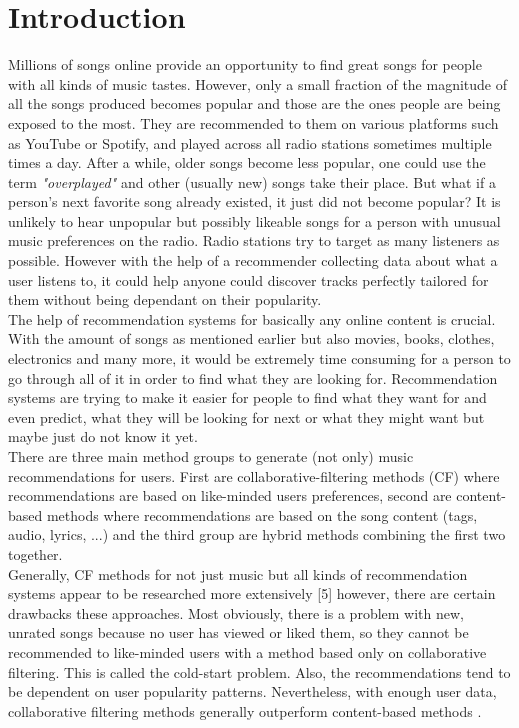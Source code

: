 \chapter{Introduction}

Millions of songs online provide an opportunity to find great songs for people with all kinds of music tastes. However, only a small fraction of the magnitude of all the songs produced becomes popular and those are the ones people are being exposed to the most.  They are recommended to them on various platforms such as YouTube or Spotify, and played across all radio stations sometimes multiple times a day. After a while, older songs become less popular, one could use the term \textit{"overplayed"} and other (usually new) songs take their place. But what if a person's next favorite song already existed, it just did not become popular? It is unlikely to hear unpopular but possibly likeable songs for a person with unusual music preferences on the radio. Radio stations try to target as many listeners as possible. However with the help of a recommender collecting data about what a user listens to, it could help anyone could discover tracks perfectly tailored for them without being dependant on their popularity. \\
The help of recommendation systems for basically any online content is crucial. With the amount of songs as mentioned earlier but also movies, books, clothes, electronics and many more, it would be extremely time consuming for a person to go through all of it in order to find what they are looking for. Recommendation systems are trying to make it easier for people to find what they want for and even predict, what they will be looking for next or what they might want but maybe just do not know it yet. \\
There are three main method groups to generate (not only) music recommendations for users. First are collaborative-filtering methods (CF) where recommendations are based on like-minded users preferences, second are content-based methods where recommendations are based on the song content (tags, audio, lyrics, ...) and the third group are hybrid methods combining the first two together. \\
Generally, CF methods for not just music  but all kinds of recommendation systems appear to be researched more extensively [5] however, there are certain drawbacks these approaches. Most obviously, there is a problem with new, unrated songs because no user has viewed or liked them, so they cannot be recommended to like-minded users with a method based only on collaborative filtering. This is called the cold-start problem. Also, the recommendations tend to be dependent on user popularity patterns. Nevertheless, with enough user data, collaborative filtering methods generally outperform content-based methods \cite{van2013deep}. \\
